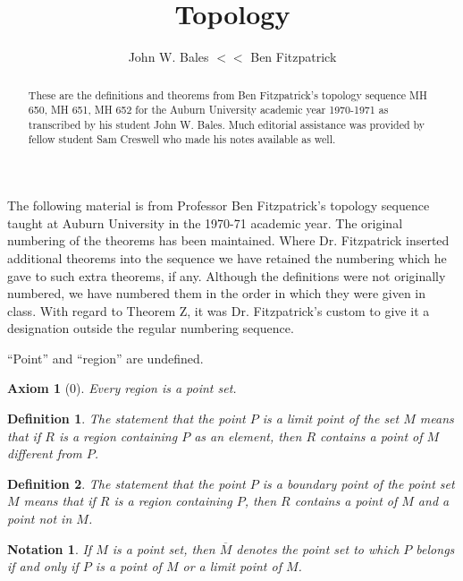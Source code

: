 \documentclass[10pt]{report}
\title{Topology}
\author{John W. Bales $<<$ Ben Fitzpatrick}
\date{}
\newtheorem{definition}{Definition}
\newtheorem*{axiom}{Axiom}
\newtheorem*{notation}{Notation}
\newcommand{\cl}[1]{\overline{#1}}
\begin{document}
\maketitle

\begin{abstract} These are the definitions and theorems from Ben Fitzpatrick's
topology sequence MH 650, MH 651, MH 652 for the Auburn University academic year
1970-1971 as transcribed by his student John W. Bales. Much editorial assistance was provided by fellow student Sam
Creswell who made his notes available as well.

\end{abstract}

The following material is from Professor Ben Fitzpatrick's topology sequence taught at Auburn University in the 1970-71
academic year. The original numbering of the theorems has been maintained. Where Dr. Fitzpatrick inserted additional
theorems into the sequence we have retained the numbering which he gave to such extra theorems, if any. Although the
definitions were not originally numbered, we have numbered them in the order in which they were given in class. With
regard to Theorem Z, it was Dr. Fitzpatrick's custom to give it a designation outside the regular numbering sequence. 

\vspace{12pt}

``Point'' and ``region'' are undefined.\\

\begin{axiom}[0] Every region is a point set.\\
\end{axiom}

\begin{definition} The statement that the point $P$ is a limit point of the set
$M$ means that if $R$ is a region containing $P$ as an element, then $R$
contains a point of $M$ different from $P$.\\
\end{definition}

\begin{definition} The statement that the point $P$ is a boundary point of the
point set $M$ means that if $R$ is a region containing $P$, then $R$ contains a
point of $M$ and a point not in $M$.\\
\end{definition}

\begin{notation} If $M$ is a point set, then ${\cl{M}}$ denotes the point
set to which $P$ belongs if and only if $P$ is a point of $M$ or a limit point
of $M$.\\
\end{notation}
\end{document}
